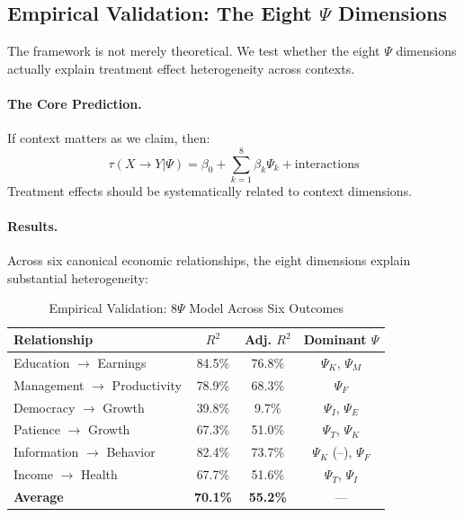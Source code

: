 \documentclass[12pt,a4paper]{article}
\begin{document}
\subsection{Empirical Validation: The Eight $\Psi$ Dimensions}

The framework is not merely theoretical. We test whether the eight $\Psi$ dimensions actually explain treatment effect heterogeneity across contexts.

\paragraph{The Core Prediction.}
If context matters as we claim, then:
\begin{equation}
    \tau(X \rightarrow Y | \Psi) = \beta_0 + \sum_{k=1}^{8} \beta_k \Psi_k + \text{interactions}
\end{equation}
Treatment effects should be systematically related to context dimensions.

\paragraph{Results.}
Across six canonical economic relationships, the eight dimensions explain substantial heterogeneity:

\begin{table}[htbp]
\centering
\caption{Empirical Validation: 8$\Psi$ Model Across Six Outcomes}
\label{tab:validation-intro}
\small
\begin{tabular}{@{}lccc@{}}
\toprule
\textbf{Relationship} & \textbf{$R^2$} & \textbf{Adj. $R^2$} & \textbf{Dominant $\Psi$} \\
\midrule
Education $\rightarrow$ Earnings & 84.5\% & 76.8\% & $\Psi_K$, $\Psi_M$ \\
Management $\rightarrow$ Productivity & 78.9\% & 68.3\% & $\Psi_F$ \\
Democracy $\rightarrow$ Growth & 39.8\% & 9.7\% & $\Psi_I$, $\Psi_E$ \\
Patience $\rightarrow$ Growth & 67.3\% & 51.0\% & $\Psi_T$, $\Psi_K$ \\
Information $\rightarrow$ Behavior & 82.4\% & 73.7\% & $\Psi_K$ (--), $\Psi_F$ \\
Income $\rightarrow$ Health & 67.7\% & 51.6\% & $\Psi_T$, $\Psi_I$ \\
\midrule
\textbf{Average} & \textbf{70.1\%} & \textbf{55.2\%} & --- \\
\bottomrule
\end{tabular}
\end{table}
\end{document}
